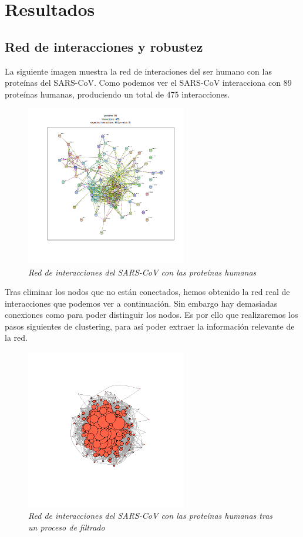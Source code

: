 \section{Resultados}

\subsection{Red de interacciones y robustez}

La siguiente imagen muestra la red de interaciones del ser humano con las proteínas del SARS-CoV. Como podemos ver el SARS-CoV interacciona con 89 proteínas humanas, produciendo un total de 475 interacciones. 
\begin{figure}
	\centering
	
	\includegraphics[width=70mm,scale=1.2]{figures/string_hits.png}
	
	\caption{\textit{Red de interacciones del SARS-CoV con las proteínas humanas}}
	
\end{figure}

Tras eliminar los nodos que no están conectados, hemos obtenido la red real de interacciones que podemos ver a continuación. Sin embargo hay demasiadas conexiones como para poder distinguir los nodos. Es por ello que realizaremos los pasos siguientes de clustering, para así poder extraer la información relevante de la red. 
\begin{figure}
	\centering
	
	\includegraphics[width=70mm,scale=1.2]{figures/hits.network_graph.png}
	
	\caption{\textit{Red de interacciones del SARS-CoV con las proteínas humanas tras un proceso de filtrado}}
	
\end{figure}


